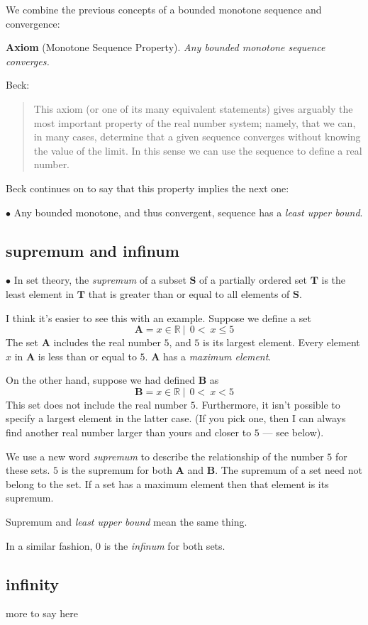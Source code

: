 \documentclass[11pt, oneside]{article}   	%
\begin{document}
We combine the previous concepts of a bounded monotone sequence and convergence:

\textbf{Axiom}  (Monotone Sequence Property). \emph{Any bounded monotone sequence converges.}

Beck:
\begin{quote}This axiom (or one of its many equivalent statements) gives arguably the most important property of the real number system; namely, that we can, in many cases, determine that a given sequence converges without knowing the value of the limit. In this sense we can use the sequence to define a real number.\end{quote}

Beck continues on to say that this property implies the next one:

$\bullet$ Any bounded monotone, and thus convergent, sequence has a \emph{least upper bound}.

\subsection*{supremum and infinum}
$\bullet$  In set theory, the \emph{supremum} of a subset $\mathbf{S}$ of a partially ordered set $\mathbf{T}$ is the least element in $\mathbf{T}$ that is greater than or equal to all elements of $\mathbf{S}$.

I think it's easier to see this with an example.  Suppose we define a set
\[ \mathbf{A} = x \in \mathbb{R} \ | \ \ 0 < \ x \le 5 \]
The set $\mathbf{A}$ includes the real number $5$, and $5$ is its largest element.  Every element $x$ in $\mathbf{A}$ is less than or equal to $5$.  $\mathbf{A}$ has a \emph{maximum element}.

On the other hand, suppose we had defined $\mathbf{B}$ as
\[ \mathbf{B} = x \in \mathbb{R} \ | \ \ 0 < \ x < 5 \]
This set does not include the real number $5$.  Furthermore, it isn't possible to specify a largest element in the latter case.  (If you pick one, then I can always find another real number larger than yours and closer to $5$ --- see below).  

We use a new word \emph{supremum} to describe the relationship of the number $5$ for these sets.  $5$ is the supremum for both $\mathbf{A}$ and $\mathbf{B}$.  The supremum of a set need not belong to the set.  If a set has a maximum element then that element is its supremum.

Supremum and \emph{least upper bound} mean the same thing.

In a similar fashion, $0$ is the \emph{infinum} for both sets.

\subsection*{infinity}

more to say here
\end{document}
